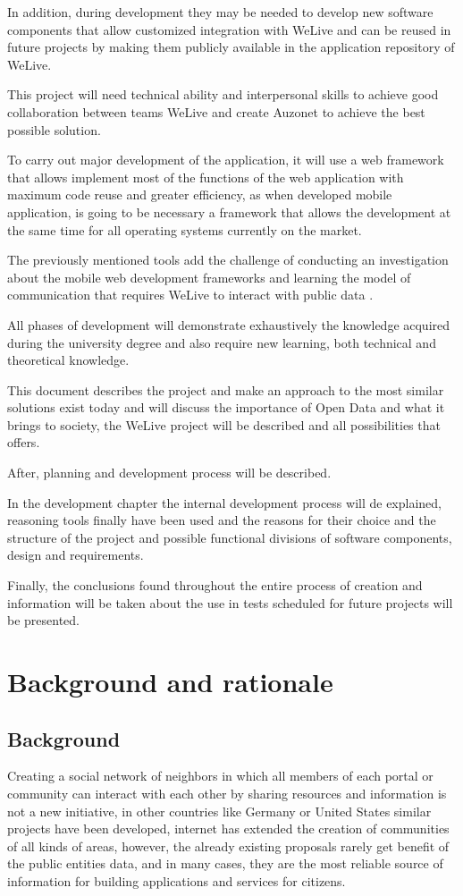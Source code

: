 \documentclass{DeustoFDP}
\begin{document}
In addition, during development they may be needed to develop new software components that allow customized integration with WeLive and can be reused in future projects by making them publicly available in the application repository of WeLive.

This project will need technical ability and interpersonal skills to achieve good collaboration between teams WeLive and create Auzonet to achieve the best possible solution.

To carry out major development of the application, it will use a web framework that allows implement most of the functions of the web application with maximum code reuse and greater efficiency, as when developed mobile application, is going to be necessary a framework that allows the development at the same time for all operating systems currently on the market.

The previously mentioned tools add the challenge of conducting an investigation about the  mobile web development frameworks and learning the model of communication that requires WeLive to interact with public data .

All phases of development will demonstrate exhaustively the knowledge acquired during the university degree and also require new learning, both technical and theoretical knowledge.

This document describes the project and make an approach to the most similar solutions exist today and will discuss the importance of Open Data and what it brings to society, the WeLive project will be described and all possibilities that offers.

After, planning and development process will be described.

In the development chapter the internal development process will de explained, reasoning tools finally have been used and the reasons for their choice and the structure of the project and possible functional divisions of software components, design and requirements.


Finally, the conclusions found throughout the entire process of creation and information will be taken about the use in tests scheduled for future projects will be presented.

\chapter{Background and rationale}
\section{Background}
Creating a social network of neighbors in which all members of each portal or community can interact with each other by sharing resources and information is not a new initiative, in other countries like Germany or United States similar projects \cite{larazon} have been developed, internet has extended the creation of communities of all kinds of areas, however, the already existing proposals rarely get benefit of the public entities data, and in many cases, they are the most reliable source of information for building applications and services for citizens.
\end{document}
